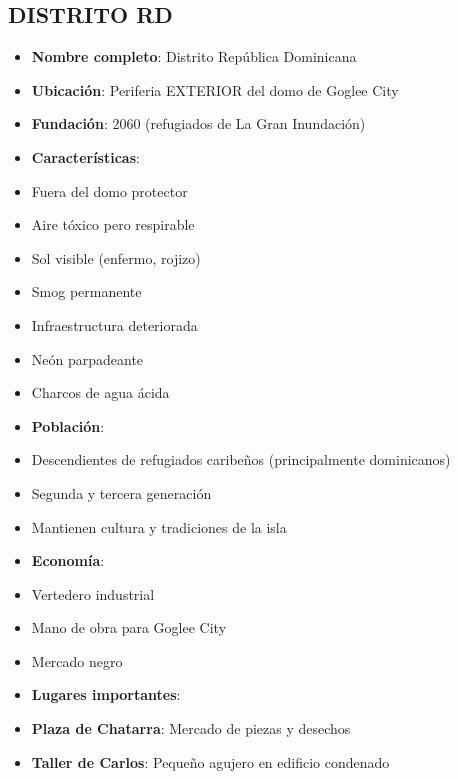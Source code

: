 \documentclass[11pt,a4paper]{report}
\begin{document}
\subsection{DISTRITO RD}
\begin{itemize}
  \item \textbf{Nombre completo}: Distrito República Dominicana
  \item \textbf{Ubicación}: Periferia EXTERIOR del domo de Goglee City
  \item \textbf{Fundación}: 2060 (refugiados de La Gran Inundación)
  \item \textbf{Características}:
  \item Fuera del domo protector
  \item Aire tóxico pero respirable
  \item Sol visible (enfermo, rojizo)
  \item Smog permanente
  \item Infraestructura deteriorada
  \item Neón parpadeante
  \item Charcos de agua ácida
  \item \textbf{Población}: 
  \item Descendientes de refugiados caribeños (principalmente dominicanos)
  \item Segunda y tercera generación
  \item Mantienen cultura y tradiciones de la isla
  \item \textbf{Economía}: 
  \item Vertedero industrial
  \item Mano de obra para Goglee City
  \item Mercado negro
  \item \textbf{Lugares importantes}:
  \item \textbf{Plaza de Chatarra}: Mercado de piezas y desechos
  \item \textbf{Taller de Carlos}: Pequeño agujero en edificio condenado

\end{itemize}
\end{document}
